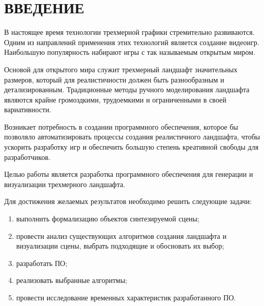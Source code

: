 \chapter*{ВВЕДЕНИЕ}


В настоящее время технологии трехмерной графики стремительно развиваются.
Одним из направлений применения этих технологий является создание видеоигр.
Наибольшую популярность набирают игры с так называемым открытым миром.

Основой для открытого мира служит трехмерный ландшафт значительных размеров, который для реалистичности должен быть разнообразным и детализированным.
Традиционные методы ручного моделирования ландшафта являются крайне громоздкими, трудоемкими и ограниченными в своей вариативности. 

Возникает потребность в создании программного обеспечения, которое бы позволяло автоматизировать процессы создания реалистичного ландшафта, чтобы ускорить разработку игр и обеспечить большую степень креативной свободы для разработчиков.

Целью работы является разработка программного обеспечения для генерации и визуализации трехмерного ландшафта.

Для достижения желаемых результатов необходимо решить следующие задачи: 

\begin{enumerate}[label={\arabic*)}]
	\item выполнить формализацию объектов синтезируемой сцены;
	\item провести анализ существующих алгоритмов создания ландшафта и визуализации сцены, выбрать подходящие и обосновать их выбор;
	\item разработать ПО;
	\item реализовать выбранные алгоритмы;
	\item провести исследование временных характеристик разработанного ПО.
\end{enumerate}


